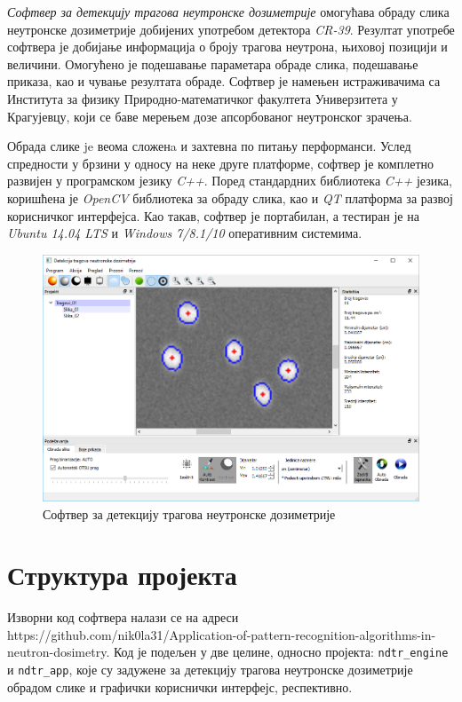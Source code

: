 \documentclass[11pt,a4paper,serbian,oneside]{book}
\begin{document}
\textit{Софтвер за детекцију трагова неутронске дозиметрије} омогућава обраду слика не\-у\-трон\-ске дозиметрије добијених употребом детектора \textit{CR-39}. Резултат употребе софтвера је добијање информација о броју трагова неутрона, њиховој позицији и величини. Омогућено је подешавање параметара обраде слика, подешавање приказа, као и чување резултата обраде. Софтвер је намењен истраживачима са Института за физику Природно-мате\-ма\-ти\-чког факултета Универзитета у Крагујевцу, који се баве мерењем дозе апсорбованог неутронског зрачења.

Обрада слике je веома сложенa и захтевна по питању перформанси. Услед спредности у брзини у односу на неке друге платформе, софтвер је комплетно развијен у програмском језику \textit{C++}. Поред стандардних библиотека \textit{C++} језика, коришћена је \textit{OpenCV} библиотека за обраду слика, као и \textit{QT} платформа за развој корисничког интерфејса. Као такав, софтвер је портабилан, а тестиран је на \textit{Ubuntu 14.04 LTS} и \textit{Windows 7/8.1/10} оперативним системима.

\begin{figure}[H]
\begin{center}
\includegraphics[width=135mm]{images/softver.PNG}
\end{center}
\caption{Софтвер за детекцију трагова неутронске дозиметрије}
\label{fig:softver}
\end{figure}

\section{Структура пројекта}
Изворни код софтвера налази се на адреси https://github.com/nik0la31/Application-of-pattern-recognition-algorithms-in-neutron-dosimetry. Код је подељен у две целине, односно пројекта: \texttt{ndtr\_engine} и \texttt{ndtr\_app}, које су задужене за детекцију трагова неутронске до\-зи\-ме\-три\-је обрадом слике и графички кориснички интерфејс, респективно.
\end{document}
